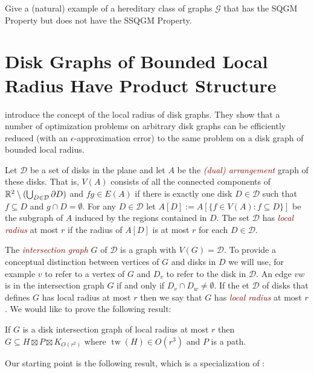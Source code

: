 \documentclass{patmorin}
\newcommand{\defin}[1]{\textcolor{Maroon}{\emph{#1}}}
\DeclareMathOperator{\tw}{tw}
\begin{document}
\begin{op}
  Give a (natural) example of a hereditary class of graphs $\mathcal{G}$ that has the SQGM Property but does not have the SSQGM Property.
\end{op}


\newpage
\section{Disk Graphs of Bounded Local Radius Have Product Structure}

\citet{lokshtanov.panolan:framework} introduce the concept of the local radius of disk graphs.  They show that a number of optimization problems on arbitrary disk graphs can be efficiently reduced (with an $\epsilon$-approximation error) to the same problem on a disk graph of bounded local radius.

Let $\mathcal{D}$ be a set of disks in the plane and let $A$ be the \defin{(dual) arrangement} graph of these disks.  That is, $V(A)$ consists of all the connected components of $\mathbb{R}^2\setminus(\bigcup_{D\in\mathcal{D}}\partial D)$ and $fg\in E(A)$ if there is exactly one disk $D\in\mathcal{D}$ such that $f\subseteq D$ and $g\cap D=\emptyset$.  For any $D\in\mathcal{D}$ let $A[D]:=A[\{f\in V(A): f\subseteq D\}]$ be the subgraph of $A$ induced by the regions contained in $D$.  The set $\mathcal{D}$ has \defin{local radius} at most $r$ if the radius of $A[D]$ is at most $r$ for each $D\in\mathcal{D}$.

The \defin{intersection graph} $G$ of $\mathcal{D}$ is a graph with $V(G)=\mathcal{D}$. To provide a conceptual distinction between vertices of $G$ and disks in $D$ we will use, for example $v$ to refer to a vertex of $G$ and $D_v$ to refer to the disk in $\mathcal{D}$.  An edge $vw$ is in the intersection graph $G$ if and only if $D_v\cap D_w\neq\emptyset$.  If the et $\mathcal{D}$ of disks that defines $G$ has local radius at most $r$ then we say that $G$ has \defin{local radius} at most $r$.  We would like to prove the following result:

\begin{thm}\label{radius_product}
   If $G$ is a disk intersection graph of local radius at most $r$ then  $G\subseteq H\boxtimes P\boxtimes K_{O(r^2)}$ where $\tw(H)\in O(r^3)$ and $P$ is a path.
\end{thm}

Our starting point is the following result, which is a specialization of \citet[Theorem~7]{hickingbotham.wood:shallow}:
\end{document}
